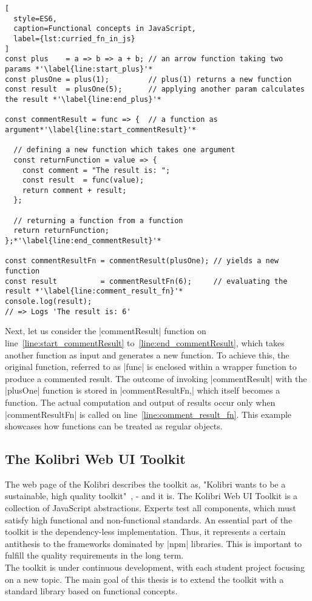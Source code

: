 \begin{lstlisting}[
  style=ES6,
  caption=Functional concepts in JavaScript,
  label={lst:curried_fn_in_js}
]
const plus    = a => b => a + b; // an arrow function taking two params *'\label{line:start_plus}'*
const plusOne = plus(1);         // plus(1) returns a new function 
const result  = plusOne(5);      // applying another param calculates the result *'\label{line:end_plus}'*

const commentResult = func => {  // a function as argument*'\label{line:start_commentResult}'*

  // defining a new function which takes one argument
  const returnFunction = value => {
    const comment = "The result is: ";
    const result  = func(value);
    return comment + result;
  };

  // returning a function from a function
  return returnFunction;
};*'\label{line:end_commentResult}'*

const commentResultFn = commentResult(plusOne); // yields a new function
const result          = commentResultFn(6);     // evaluating the result *'\label{line:comment_result_fn}'*   
console.log(result);
// => Logs 'The result is: 6'
\end{lstlisting}
Next, let us consider the |commentResult| function on
line~\ref{line:start_commentResult} to~\ref{line:end_commentResult}, 
which takes another function
as input and generates a new function. To achieve this, the original function,
referred to as |func| is enclosed within a wrapper function to produce a
commented result. The outcome of invoking |commentResult| with the |plusOne|
function is stored in |commentResultFn,| which itself becomes a function. The
actual computation and output of results occur only when |commentResultFn| is
called on line~\ref{line:comment_result_fn}. This example showcases how 
functions can be treated as regular objects.

\subsection{The Kolibri Web UI Toolkit}
\label{sub:The Kolibri Web UI Toolkit}
The web page of the Kolibri describes the toolkit as, "Kolibri wants to be a
sustainable, high quality toolkit"~\cite{kolibri}, - and it is.
The Kolibri Web UI Toolkit is a collection of JavaScript abstractions. Experts test all
components, which must satisfy high functional and non-functional standards. An
essential part of the toolkit is the dependency-less implementation. Thus, it
represents a certain antithesis to the frameworks dominated by |npm| libraries.
This is important to fulfill the quality requirements in the long term.\\
The toolkit is under continuous development, with each student project focusing
on a new topic. The main goal of this thesis is to extend the toolkit
with a standard library based on functional concepts. 


